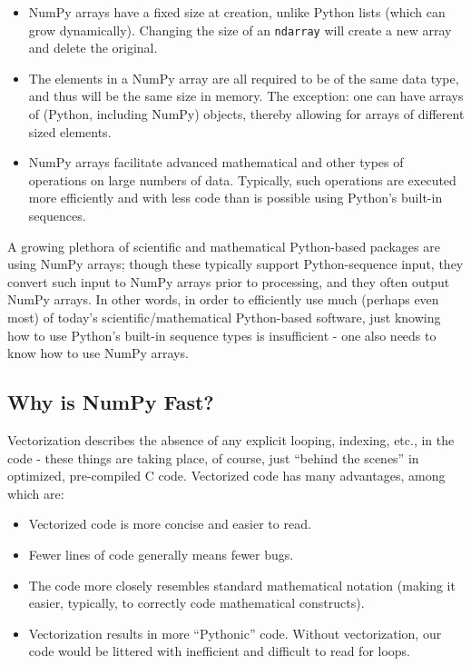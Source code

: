 \begin{itemize}
	\item NumPy arrays have a fixed size at creation, unlike Python lists (which can
	grow dynamically). Changing the size of an \texttt{ndarray} will create a
	new array and delete the original.\cite{NumPy:2024}
	
	\item The elements in a NumPy array are all required to be of the same data type,
	and thus will be the same size in memory. The exception: one can have arrays
	of (Python, including NumPy) objects, thereby allowing for arrays of
	different sized elements.
	
	\item NumPy arrays facilitate advanced mathematical and other types of operations
	on large numbers of data. Typically, such operations are executed more efficiently
	and with less code than is possible using Python’s built-in sequences.
\end{itemize}

A growing plethora of scientific and mathematical Python-based packages are
using NumPy arrays; though these typically support Python-sequence input, they
convert such input to NumPy arrays prior to processing, and they often output NumPy
arrays. In other words, in order to efficiently use much (perhaps even most) of today’s
scientific/mathematical Python-based software, just knowing how to use Python’s
built-in sequence types is insufficient - one also needs to know how to use
NumPy arrays.

\subsection{Why is NumPy Fast?}

Vectorization describes the absence of any explicit looping, indexing, etc., in the
code - these things are taking place, of course, just “behind the scenes” in optimized,
pre-compiled C code. Vectorized code has many advantages, among which are:

\begin{itemize}
	\item Vectorized code is more concise and easier to read.
	
	\item Fewer lines of code generally means fewer bugs.
	
	\item The code more closely resembles standard mathematical notation (making
	it easier, typically, to correctly code mathematical constructs).
	
	\item Vectorization results in more “Pythonic” code. Without vectorization, our
	code would be littered with inefficient and difficult to read for loops.
\end{itemize}

